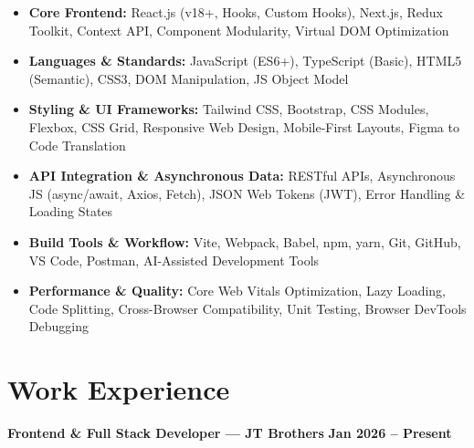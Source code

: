 \documentclass[a4paper,10pt]{article}
\begin{document}
\begin{itemize}

    \item \textbf{Core Frontend:}
    React.js (v18+, Hooks, Custom Hooks), Next.js, Redux Toolkit,
    Context API, Component Modularity, Virtual DOM Optimization

    \item \textbf{Languages \& Standards:}
    JavaScript (ES6+), TypeScript (Basic), HTML5 (Semantic), CSS3,
    DOM Manipulation, JS Object Model

    \item \textbf{Styling \& UI Frameworks:}
    Tailwind CSS, Bootstrap, CSS Modules, Flexbox, CSS Grid,
    Responsive Web Design, Mobile-First Layouts, Figma to Code Translation

    \item \textbf{API Integration \& Asynchronous Data:}
    RESTful APIs, Asynchronous JS (async/await, Axios, Fetch),
    JSON Web Tokens (JWT), Error Handling \& Loading States

    \item \textbf{Build Tools \& Workflow:}
    Vite, Webpack, Babel, npm, yarn, Git, GitHub, VS Code, Postman,
    AI-Assisted Development Tools

    \item \textbf{Performance \& Quality:}
    Core Web Vitals Optimization, Lazy Loading, Code Splitting,
    Cross-Browser Compatibility, Unit Testing, Browser DevTools Debugging

\end{itemize}

\section*{Work Experience}

\textbf{Frontend \& Full Stack Developer --- JT Brothers}
\hfill
\textbf{Jan 2026 -- Present}
\end{document}
